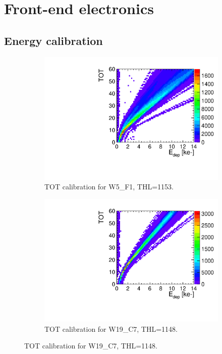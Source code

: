 \chapter{Front-end electronics}
\label{sec:appendixFE_electronics}

\section{Energy calibration}\label{sec:appendix_energy_calibration}

\begin{figure}[htbp] \centering
  \begin{subfigure}[b]{0.45\textwidth}
    \includegraphics[width=\textwidth]{./figures/Calibration/TOTcalibration_W0005_F01_thresh1153.pdf}
    \caption{TOT calibration for W5\_F1, THL=1153.}
    \label{fig:TOTcalibW5F1}
  \end{subfigure}\hfill
  \begin{subfigure}[b]{0.45\textwidth}
    \includegraphics[width=\textwidth]{./figures/Calibration/TOTcalibration_W0019_C07_thresh1148.pdf}
    \caption{TOT calibration for W19\_C7, THL=1148.}
    \label{fig:TOTcalibW19C7}
  \end{subfigure}
\end{figure}


